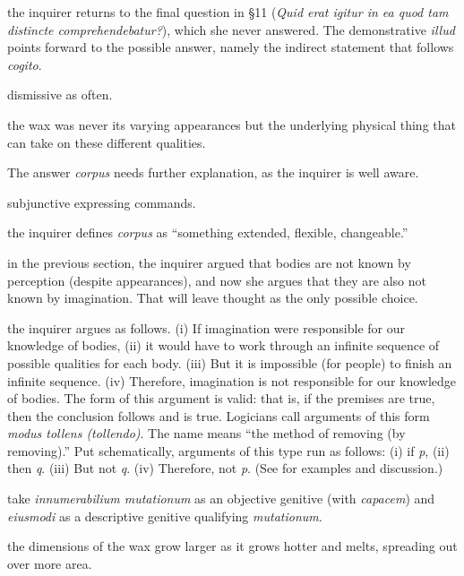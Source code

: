  the inquirer returns to the final question in §11 (\textit{Quid erat igitur in ea quod tam distincte comprehendebatur?}), which she never answered. The demonstrative \textit{illud} points forward to the possible answer, namely the indirect statement that follows \textit{cogito}.

 dismissive as often.

 the wax was never its varying appearances but the underlying physical thing that can take on these different qualities.

 The answer \textit{corpus} needs further explanation, as the inquirer is well aware.

 subjunctive expressing commands.

 the inquirer defines \textit{corpus} as ``something extended, flexible, changeable.''

 in the previous section, the inquirer argued that bodies are not known by perception (despite appearances), and now she argues that they are also not known by imagination. That will leave thought as the only possible choice.

 the inquirer argues as follows. (i) If imagination were responsible for our knowledge of bodies, (ii) it would have to work through an infinite sequence of possible qualities for each body. (iii) But it is impossible (for people) to finish an infinite sequence. (iv) Therefore, imagination is not responsible for our knowledge of bodies. The form of this argument is valid: that is, if the premises are true, then the conclusion follows and is true. Logicians call arguments of this form \textit{modus tollens (tollendo)}. The name means ``the method of removing (by removing).'' Put schematically, arguments of this type run as follows: (i) if \textit{p}, (ii) then \textit{q}. (iii) But not \textit{q}. (iv) Therefore, not \textit{p}. (See \cite[§23]{weston2009} for examples and discussion.)

 take \textit{innumerabilium mutationum} as an objective genitive (with \textit{capacem}) and \textit{eiusmodi} as a descriptive genitive qualifying \textit{mutationum}.

 the dimensions of the wax grow larger as it grows hotter and melts, spreading out over more area.

